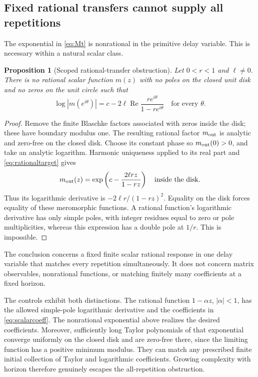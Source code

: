 \documentclass[11pt]{article}
\numberwithin{equation}{section}
\newtheorem{proposition}[theorem]{Proposition}
\theoremstyle{definition}
\theoremstyle{remark}
\newcommand{\re}{\operatorname{Re}}
\begin{document}
\subsection{Fixed rational transfers cannot supply all repetitions}
The exponential in \eqref{eq:Mt} is nonrational in the primitive delay variable. This is necessary within a natural scalar class.
\begin{proposition}[Scoped rational-transfer obstruction]
Let $0<r<1$ and $\ell\ne0$. There is no rational scalar function $m(z)$ with no poles on the closed unit disk and no zeros on the unit circle such that
\begin{equation}
 \log|m(e^{i\theta})|
 =c-2\ell\re\frac{re^{i\theta}}{1-re^{i\theta}}
 \quad\text{for every }\theta.
 \label{eq:rationaltarget}
\end{equation}
\end{proposition}
\begin{proof}
Remove the finite Blaschke factors associated with zeros inside the disk; these have boundary modulus one. The resulting rational factor $m_{\rm out}$ is analytic and zero-free on the closed disk. Choose its constant phase so $m_{\rm out}(0)>0$, and take an analytic logarithm. Harmonic uniqueness applied to its real part and \eqref{eq:rationaltarget} gives
\begin{equation}
 m_{\rm out}(z)=\exp\left(c-\frac{2\ell rz}{1-rz}\right)
 \quad\text{inside the disk}.
\end{equation}
Thus its logarithmic derivative is $-2\ell r/(1-rz)^2$. Equality on the disk forces equality of these meromorphic functions. A rational function's logarithmic derivative has only simple poles, with integer residues equal to zero or pole multiplicities, whereas this expression has a double pole at $1/r$. This is impossible.
\end{proof}
The conclusion concerns a fixed finite scalar rational response in one delay variable that matches every repetition simultaneously. It does not concern matrix observables, nonrational functions, or matching finitely many coefficients at a fixed horizon.

The controls exhibit both distinctions. The rational function $1-\alpha z$, $|\alpha|<1$, has the allowed simple-pole logarithmic derivative and the coefficients in \eqref{eq:scalarcoeff}. The nonrational exponential above realizes the desired coefficients. Moreover, sufficiently long Taylor polynomials of that exponential converge uniformly on the closed disk and are zero-free there, since the limiting function has a positive minimum modulus. They can match any prescribed finite initial collection of Taylor and logarithmic coefficients. Growing complexity with horizon therefore genuinely escapes the all-repetition obstruction.
\end{document}
